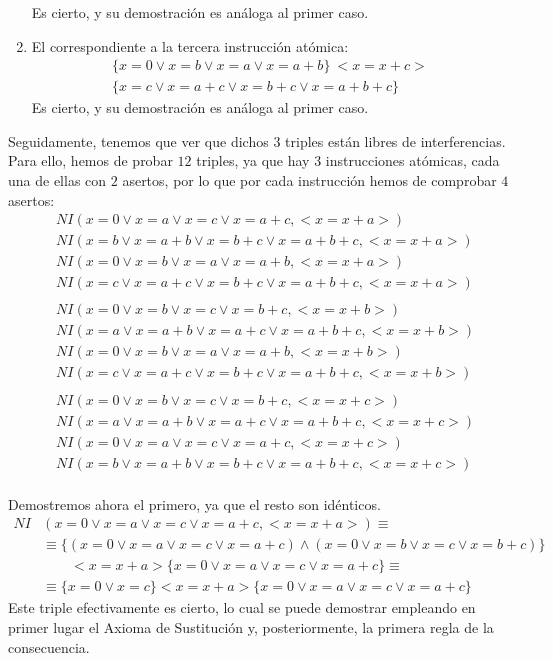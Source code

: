 \begin{ejercicio}
\begin{enumerate}
    Es cierto, y su demostración es análoga al primer caso.
    \item El correspondiente a la tercera instrucción atómica:
    \begin{gather*}
        \{x=0 \lor x=b \lor x=a \lor x=a+b\}\ <x=x+c>\ \\ \{x=c \lor x=a+c \lor x=b+c \lor x=a+b+c\}
    \end{gather*}
    Es cierto, y su demostración es análoga al primer caso.
\end{enumerate}

Seguidamente, tenemos que ver que dichos $3$ triples están libres de interferencias. Para ello, hemos de probar $12$ triples, ya que hay $3$ instrucciones atómicas, cada una de ellas con $2$ asertos, por lo que por cada instrucción hemos de comprobar $4$ asertos:
\begin{align*}
    &NI(x=0 \lor x=a \lor x=c \lor x=a+c, <x=x+a>)\\
    &NI(x=b \lor x=a+b \lor x=b+c \lor x=a+b+c, <x=x+a>)\\
    &NI(x=0 \lor x=b \lor x=a \lor x=a+b, <x=x+a>)\\
    &NI(x=c \lor x=a+c \lor x=b+c \lor x=a+b+c, <x=x+a>)\\ \\
    &NI(x=0 \lor x=b \lor x=c \lor x=b+c, <x=x+b>)\\
    &NI(x=a \lor x=a+b \lor x=a+c \lor x=a+b+c, <x=x+b>)\\
    &NI(x=0 \lor x=b \lor x=a \lor x=a+b, <x=x+b>)\\
    &NI(x=c \lor x=a+c \lor x=b+c \lor x=a+b+c, <x=x+b>)\\ \\
    &NI(x=0 \lor x=b \lor x=c \lor x=b+c, <x=x+c>)\\
    &NI(x=a \lor x=a+b \lor x=a+c \lor x=a+b+c, <x=x+c>)\\
    &NI(x=0 \lor x=a \lor x=c \lor x=a+c, <x=x+c>)\\
    &NI(x=b \lor x=a+b \lor x=b+c \lor x=a+b+c, <x=x+c>)\\
\end{align*}

Demostremos ahora el primero, ya que el resto son idénticos.
\begin{align*}
    NI&(x=0 \lor x=a \lor x=c \lor x=a+c, <x=x+a>)\equiv \\
    &\equiv \{(x=0 \lor x=a \lor x=c \lor x=a+c) \land (x=0 \lor x=b \lor x=c \lor x=b+c)\}\\&\qquad <x=x+a> \{x=0 \lor x=a \lor x=c \lor x=a+c\}\equiv \\
    &\equiv \{x=0 \lor x=c\} <x=x+a> \{x=0 \lor x=a \lor x=c \lor x=a+c\}
\end{align*}
Este triple efectivamente es cierto, lo cual se puede demostrar empleando en primer lugar el Axioma de Sustitución y, posteriormente, la primera regla de la consecuencia.\\


\end{ejercicio}
